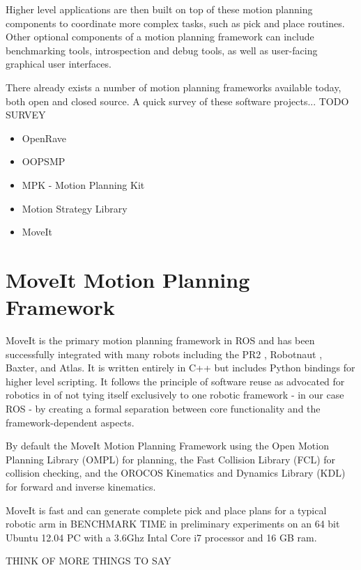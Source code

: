 \documentclass[10pt,journal,compsoc]{joser1}
\begin{document}
{Higher level applications are then built on top of these motion planning components to coordinate more complex tasks, such as pick and place routines. Other optional components of a motion planning framework can include benchmarking tools, introspection and debug tools, as well as user-facing graphical user interfaces. 

There already exists a number of motion planning frameworks available today, both open and closed source. A quick survey of these software projects... TODO SURVEY

\begin{itemize}
    \item OpenRave
    \item OOPSMP
    \item MPK - Motion Planning Kit
    \item Motion Strategy Library
    \item MoveIt
\end{itemize}

\section{MoveIt Motion Planning Framework}
\label{sec::moveit}

MoveIt is the primary motion planning framework in ROS and has been successfully integrated with many robots including the PR2 \cite{wyrobek2008towards}, Robotnaut \cite{ambrose2000robonaut}, Baxter, and Atlas. It is written entirely in C++ but includes Python bindings for higher level scripting. It follows the principle of software reuse as advocated for robotics in \cite{makarenko2007benefits} of not tying itself exclusively to one robotic framework - in our case ROS - by creating a formal separation between core functionality and the framework-dependent aspects. 

By default the MoveIt Motion Planning Framework using the Open Motion Planning Library (OMPL) \cite{sucan2012the-open-motion-planning-library} for planning, the Fast Collision Library (FCL) \cite{fcl} for collision checking, and the OROCOS Kinematics and Dynamics Library (KDL) \cite{bruyninckx2001open} for forward and inverse kinematics. 

MoveIt is fast and can generate complete pick and place plans for a typical robotic arm in BENCHMARK TIME in preliminary experiments on an 64 bit Ubuntu 12.04 PC with a 3.6Ghz Intal Core i7 processor and 16 GB ram.

THINK OF MORE THINGS TO SAY

}
\end{document}
